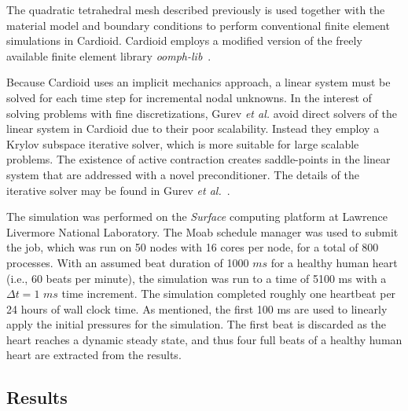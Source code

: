 The quadratic tetrahedral mesh described previously is used together with the material model and boundary conditions to perform conventional finite element simulations in Cardioid. Cardioid employs a modified version of the freely available finite element library \textit{oomph-lib}~\cite{oomph}.

Because Cardioid uses an implicit mechanics approach, a linear system must be solved for each time step for incremental nodal unknowns. In the interest of solving problems with fine discretizations, Gurev \textit{et al.} avoid direct solvers of the linear system in Cardioid due to their poor scalability. Instead they employ a Krylov subspace iterative solver, which is more suitable for large scalable problems. The existence of active contraction creates saddle-points in the linear system that are addressed with a novel preconditioner. The details of the iterative solver may be found in Gurev \textit{et al.}~\cite{gurev_2015}.

The simulation was performed on the \textit{Surface} computing platform at Lawrence Livermore National Laboratory. The Moab schedule manager was used to submit the job, which was run on 50 nodes with 16 cores per node, for a total of 800 processes. With an assumed beat duration of 1000 $ms$ for a healthy human heart (i.e., 60 beats per minute), the simulation was run to a time of 5100 ms with a $\Delta t = 1$ $ms$ time increment. The simulation completed roughly one heartbeat per 24 hours of wall clock time. As mentioned, the first 100 ms are used to linearly apply the initial pressures for the simulation. The first beat is discarded as the heart reaches a dynamic steady state, and thus four full beats of a healthy human heart are extracted from the results.

\subsection{Results}
\label{Results}

